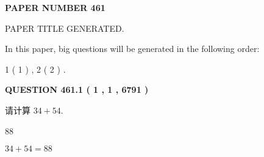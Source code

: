 \documentclass{ctexart}
\begin{document}
   
   
   
\newpage 
\setcounter{page}{ 
   461001 } 
   
   
   
   
 {\textbf{ \Large{ PAPER NUMBER  461  }}}
   
   
\vspace{0.2in}
   
   
   
   
   
   
   
   
 \vspace{0.2in}
 
 
 
 
   
   
 PAPER TITLE GENERATED.
   
   
   
\vspace{0.2in}
   
In this paper, big questions will be generated in the following order: 
   
   
   1 ( 1 )
 ,
   2 ( 2 )
 .
  
\vspace{0.2in}
  
{\textbf{\Large{QUESTION
461.1 
 ( 1 , 1 , 6791 )
}}}
  
  
 
请计算 $ %
34 +  %
54 $.
 
 
 
\noindent{}
 
 

88
 
 
\noindent{}
 
 

 
 
 
\noindent{}
 
 

$ %
34 +  %
54=   %
88$
 
 
\noindent{}
 
 

 
   
   
   
\end{document}
